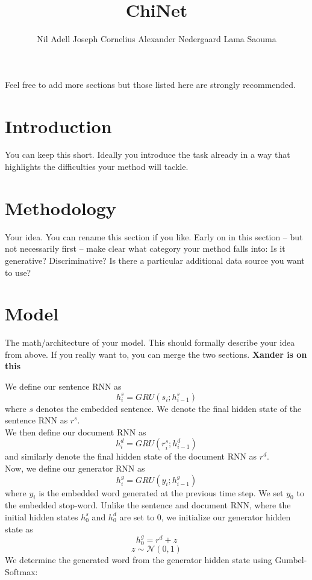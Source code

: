 \documentclass{article}
\title{ChiNet}
\author{Nil Adell \qquad Joseph Cornelius \qquad Alexander Nedergaard \qquad Lama Saouma}
\begin{document}

\maketitle


Feel free to add more sections but those listed here are strongly recommended.
\section{Introduction}
You can keep this short. Ideally you introduce the task already in a way that highlights the difficulties  your method will tackle.
\section{Methodology}
Your idea. You can rename this section if you like. Early on in this section -- but not necessarily first -- make clear what category your method falls into: Is it generative? Discriminative? Is there a particular additional data source you want to use?
\section{Model}
The math/architecture of your model. This should formally describe your idea from above. If you really want to, you can merge the two sections. \textbf{Xander is on this}

We define our sentence RNN as
$$ h^{s}_{i} = GRU(s_{i}; h^{s}_{i-1})$$
where $s$ denotes the embedded sentence. We denote the final hidden state of the sentence RNN as $r^{s}$. \\
We then define our document RNN as
$$ h^{d}_{i} = GRU(r^{s}_{i}; h^{d}_{i-1}) $$
and similarly denote the final hidden state of the document RNN as $r^{d}$. \\
Now, we define our generator RNN as
$$ h^{g}_{i} = GRU(y_{i}; h^{g}_{i-1}) $$
where $y_{i}$ is the embedded word generated at the previous time step. We set $y_{0}$ to the embedded stop-word. Unlike the sentence and document RNN, where the initial hidden states $h^{s}_{0}$ and $h^{d}_{0}$ are set to 0, we initialize our generator hidden state as
$$ h^{g}_{0} = r^{d} + z $$
$$ z \sim \mathcal{N}(0,1) $$
We determine the generated word from the generator hidden state using Gumbel-Softmax:
\end{document}
